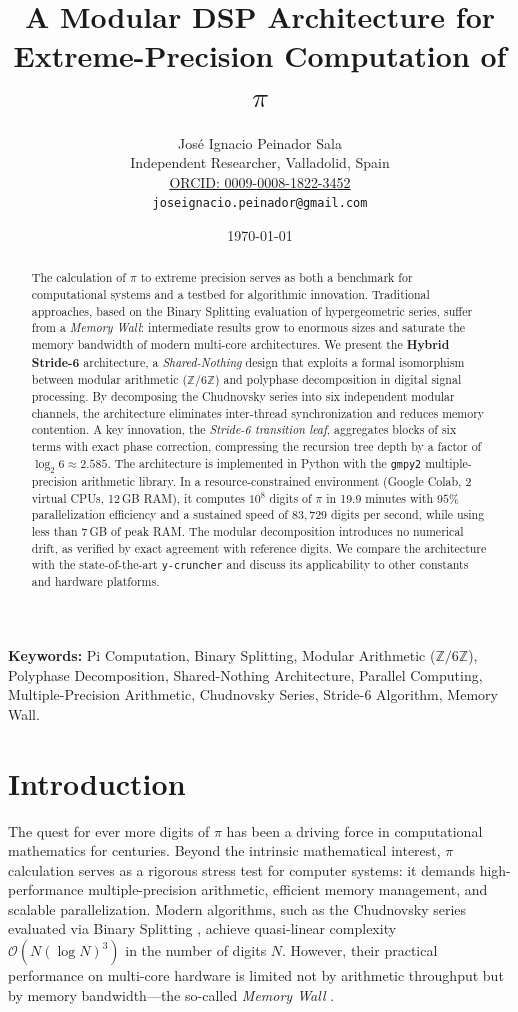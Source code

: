 \documentclass[12pt,a4paper]{article}
\title{\textbf{A Modular DSP Architecture for\\ Extreme-Precision Computation of \(\pi\)}}
\author{José Ignacio Peinador Sala\\
\small Independent Researcher, Valladolid, Spain\\
\small \href{https://orcid.org/0009-0008-1822-3452}{ORCID: 0009-0008-1822-3452}\\
\small \texttt{joseignacio.peinador@gmail.com}}
\date{\today}
\theoremstyle{plain}
\theoremstyle{definition}
\theoremstyle{remark}
\begin{document}
\maketitle

\begin{abstract}
The calculation of \(\pi\) to extreme precision serves as both a benchmark for computational systems and a testbed for algorithmic innovation. Traditional approaches, based on the Binary Splitting evaluation of hypergeometric series, suffer from a \emph{Memory Wall}: intermediate results grow to enormous sizes and saturate the memory bandwidth of modern multi-core architectures. We present the \textbf{Hybrid Stride-6} architecture, a \emph{Shared-Nothing} design that exploits a formal isomorphism between modular arithmetic (\(\mathbb{Z}/6\mathbb{Z}\)) and polyphase decomposition in digital signal processing. By decomposing the Chudnovsky series into six independent modular channels, the architecture eliminates inter-thread synchronization and reduces memory contention. A key innovation, the \emph{Stride-6 transition leaf}, aggregates blocks of six terms with exact phase correction, compressing the recursion tree depth by a factor of \(\log_2 6 \approx 2.585\). The architecture is implemented in Python with the \texttt{gmpy2} multiple-precision arithmetic library. In a resource-constrained environment (Google Colab, 2 virtual CPUs, 12\,GB RAM), it computes \(10^8\) digits of \(\pi\) in 19.9 minutes with \(95\%\) parallelization efficiency and a sustained speed of \(83{,}729\) digits per second, while using less than \(7\)\,GB of peak RAM. The modular decomposition introduces no numerical drift, as verified by exact agreement with reference digits. We compare the architecture with the state-of-the-art \texttt{y-cruncher} and discuss its applicability to other constants and hardware platforms.
\end{abstract}
\vspace{1em}
\noindent\textbf{Keywords:} Pi Computation, Binary Splitting, Modular Arithmetic (\(\mathbb{Z}/6\mathbb{Z}\)), Polyphase Decomposition, Shared-Nothing Architecture, Parallel Computing, Multiple-Precision Arithmetic, Chudnovsky Series, Stride-6 Algorithm, Memory Wall.

\section{Introduction}
The quest for ever more digits of \(\pi\) has been a driving force in computational mathematics for centuries. Beyond the intrinsic mathematical interest, \(\pi\) calculation serves as a rigorous stress test for computer systems: it demands high-performance multiple-precision arithmetic, efficient memory management, and scalable parallelization. Modern algorithms, such as the Chudnovsky series evaluated via Binary Splitting \cite{chudnovsky}, achieve quasi-linear complexity \(\mathcal{O}(N(\log N)^3)\) in the number of digits \(N\). However, their practical performance on multi-core hardware is limited not by arithmetic throughput but by memory bandwidth---the so-called \emph{Memory Wall} \cite{wulf1995hitting}.
\end{document}
